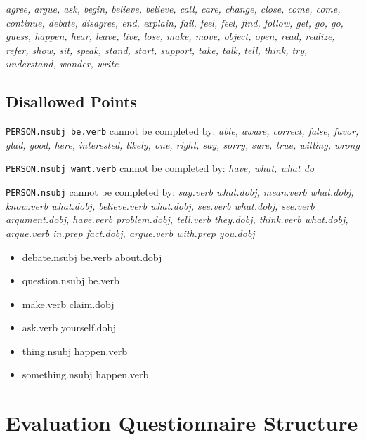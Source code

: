 \begin{appendices}
        \textit{agree, argue, ask, begin, believe, believe, call, care, change, close, come, come, continue, debate, disagree, end, explain, fail, feel, feel, find, follow, get, go, go, guess, happen, hear, leave, live, lose, make, move, object, open, read, realize, refer, show, sit, speak, stand, start, support, take, talk, tell, think, try, understand, wonder, write}

      \section{Disallowed Points}
        \texttt{PERSON.nsubj be.verb} cannot be completed by: \textit{able, aware, correct, false, favor, glad, good, here, interested, likely, one, right, say, sorry, sure, true, willing, wrong}

        \noindent\texttt{PERSON.nsubj want.verb} cannot be completed by: \textit{have, what, what do}

        \noindent\texttt{PERSON.nsubj} cannot be completed by: \textit{say.verb what.dobj, mean.verb what.dobj, know.verb what.dobj, believe.verb what.dobj, see.verb what.dobj, see.verb argument.dobj, have.verb problem.dobj, tell.verb they.dobj, think.verb what.dobj, argue.verb in.prep fact.dobj, argue.verb with.prep you.dobj}

        \begin{itemize}
		  \item{debate.nsubj be.verb about.dobj}
		  \item{question.nsubj be.verb}
		  \item{make.verb claim.dobj}
		  \item{ask.verb yourself.dobj}
		  \item{thing.nsubj happen.verb}
		  \item{something.nsubj happen.verb}
        \end{itemize}

    \chapter{Evaluation Questionnaire Structure \label{app:evaluation-questionnaire-layouts}}
\end{appendices}
